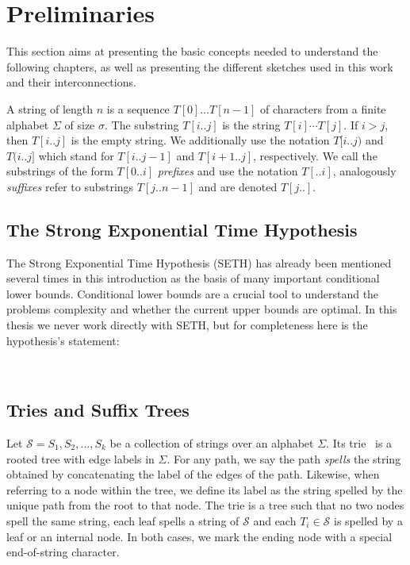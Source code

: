 \section{Preliminaries}\label{sec:prelim}

This section aims at presenting the basic concepts needed to understand the following chapters, as well as presenting the different sketches used in this work and their interconnections.

A string of length $n$ is a sequence $T[0] \dots T[n-1]$ of characters from a finite alphabet $\Sigma$ of size $\sigma$. The substring $T[i..j]$ is the string $T[i] \cdots T[j]$. %
If $i > j$, then $T[i..j]$ is the empty string. We additionally use the notation $T[i..j)$ and $T(i..j]$ which stand for $T[i..j-1]$ and $T[i+1..j]$, respectively. We call the substrings of the form $T[0..i]$ \emph{prefixes}  and use the notation $T[..i]$, analogously \emph{suffixes} refer to substrings $T[j..n-1]$ and are denoted $T[j..]$.

\subsection{The Strong Exponential Time Hypothesis}

The Strong Exponential Time Hypothesis (SETH) has already been mentioned several times in this introduction as the basis of many important conditional lower bounds. Conditional lower bounds are a crucial tool to understand the problems complexity and whether the current upper bounds are optimal. In this thesis we never work directly with SETH, but for completeness here is the hypothesis's statement:

\\

\subsection{Tries and Suffix Trees}\label{sec:prelim:tries}
Let $\mathcal{S} = {S_1,S_2, ..., S_k}$ be a collection of strings over an alphabet $\Sigma$. Its trie~\cite{thue1912gegenseitige,de1959file,fredkin1960trie} is a rooted tree with edge labels in $\Sigma$.
For any path, we say the path \emph{spells} the string obtained by concatenating the label of the edges of the path.
Likewise, when referring to a node within the tree, we define its label as the string spelled by the unique path from the root to that node.
The trie is a tree such that no two nodes spell the same string, each leaf spells a string of $\mathcal{S}$ and each $T_i \in \mathcal{S}$ is spelled by a leaf or an internal node. In both cases, we mark the ending node with a special end-of-string character.

